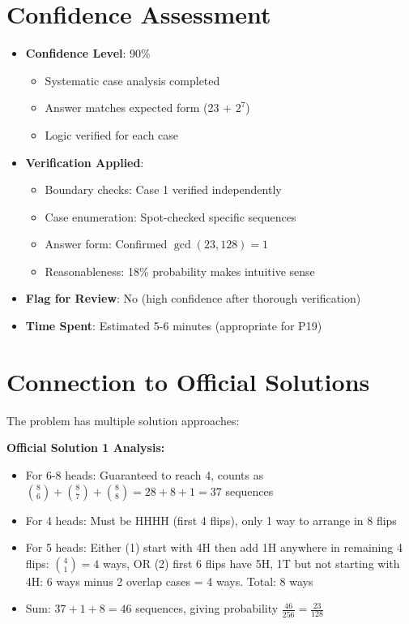 \documentclass[]{article}
\begin{document}
\section*{Confidence Assessment}
\begin{itemize}[leftmargin=*]
    \item \textbf{Confidence Level}: 90\% 
    \begin{itemize}
        \item Systematic case analysis completed
        \item Answer matches expected form (23 + $2^7$)
        \item Logic verified for each case
    \end{itemize}
    \item \textbf{Verification Applied}: 
    \begin{itemize}
        \item Boundary checks: Case 1 verified independently
        \item Case enumeration: Spot-checked specific sequences
        \item Answer form: Confirmed $\gcd(23,128) = 1$
        \item Reasonableness: 18\% probability makes intuitive sense
    \end{itemize}
    \item \textbf{Flag for Review}: No (high confidence after thorough verification)
    \item \textbf{Time Spent}: Estimated 5-6 minutes (appropriate for P19)
\end{itemize}

\section*{Connection to Official Solutions}

The problem has multiple solution approaches:

\textbf{Official Solution 1 Analysis:}
\begin{itemize}
    \item For 6-8 heads: Guaranteed to reach 4, counts as $\binom{8}{6}+\binom{8}{7}+\binom{8}{8} = 28+8+1 = 37$ sequences
    \item For 4 heads: Must be HHHH (first 4 flips), only 1 way to arrange in 8 flips
    \item For 5 heads: Either (1) start with 4H then add 1H anywhere in remaining 4 flips: $\binom{4}{1}=4$ ways, OR (2) first 6 flips have 5H, 1T but not starting with 4H: $6$ ways minus 2 overlap cases = 4 ways. Total: 8 ways
    \item Sum: $37 + 1 + 8 = 46$ sequences, giving probability $\frac{46}{256}=\frac{23}{128}$
\end{itemize}
\end{document}
